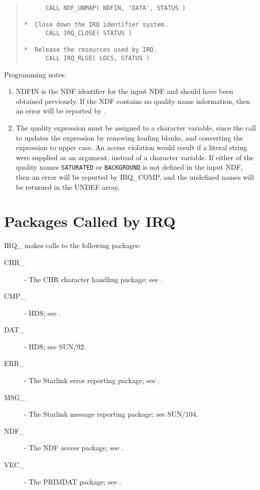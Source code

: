 \documentclass[twoside,11pt,nolof]{starlink}
\begin{document}
\begin{quote}
\begin{tabbing}
\verb#      CALL NDF_UNMAP( NDFIN, 'DATA', STATUS )          #\\
\verb#                                                       #\\
\verb#*  Close down the IRQ identifier system.               #\\
\verb#      CALL IRQ_CLOSE( STATUS )                         #\\
\verb#                                                       #\\
\verb#*  Release the resources used by IRQ.                  #\\
\verb#      CALL IRQ_RLSE( LOCS, STATUS )                    #\\

\end{tabbing}
\end{quote}

Programming notes:

\begin{enumerate}

\label{NOTE1}
\item NDFIN is the NDF identifier for the input NDF and should have been
obtained previously. If the NDF contains no quality name information, then
an error will be reported by .

\label{NOTE2}
\item The quality expression must be assigned to a character variable,
since the call to  updates the expression by
removing leading blanks, and converting the expression to upper case. An
access violation would result if a literal string were supplied as an
argument, instead of a character variable. If either of the quality names
\texttt{SATURATED} or \texttt{BACKGROUND} is not defined in the input NDF, then
an error will be reported by IRQ\_COMP, and the undefined names will be
returned in the UNDEF array.

\end{enumerate}

\section {Packages Called by IRQ}

IRQ\_ makes calls to the following packages:
\begin {description}
\item [CHR\_] - The CHR character handling package; see .
\item [CMP\_] - HDS; see  .
\item [DAT\_] - HDS; see SUN/92.
\item [ERR\_] - The Starlink error reporting package; see .
\item [MSG\_] - The Starlink message reporting package; see SUN/104.
\item [NDF\_] - The NDF access package; see  .
\item [VEC\_] - The PRIMDAT package; see  .
\end{description}
\end{document}
